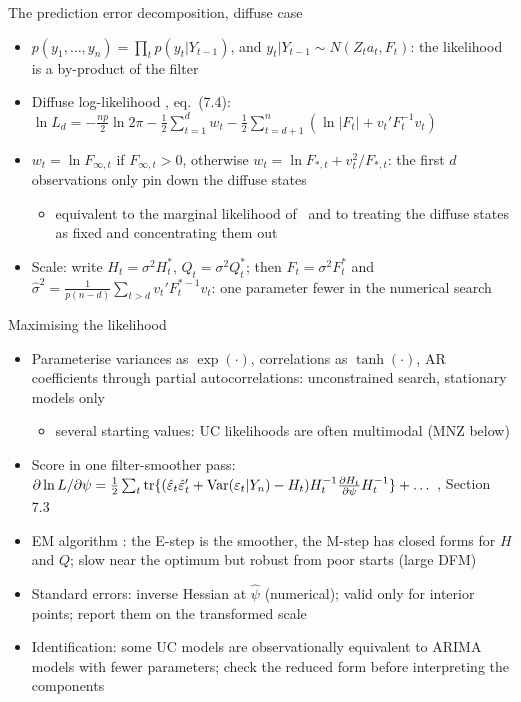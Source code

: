 \begin{frame}{The prediction error decomposition, diffuse case}
\itemsize{\small}
\begin{itemize}
    \item $p(y_1, \dots, y_n) = \prod_t p(y_t | Y_{t-1})$, and $y_t | Y_{t-1} \sim N(Z_ta_t, F_t)$: the likelihood is a by-product of the filter
    \item Diffuse log-likelihood , eq.~(7.4): $\ln L_d = -\frac{np}{2}\ln 2\pi - \frac12\sum_{t=1}^d w_t - \frac12\sum_{t=d+1}^n(\ln|F_t| + v_t'F_t^{-1}v_t)$
    \item $w_t = \ln F_{\infty,t}$ if $F_{\infty,t} > 0$, otherwise $w_t = \ln F_{*,t} + v_t^2/F_{*,t}$: the first $d$ observations only pin down the diffuse states
    \begin{itemize}
        \item equivalent to the marginal likelihood of \ and to treating the diffuse states as fixed and concentrating them out
    \end{itemize}
    \item Scale: write $H_t = \sigma^2H^*_t$, $Q_t = \sigma^2Q^*_t$; then $F_t = \sigma^2F^*_t$ and $\hat\sigma^2 = \frac{1}{p(n - d)}\sum_{t>d}v_t'F_t^{*-1}v_t$: one parameter fewer in the numerical search
\end{itemize}
\end{frame}

\begin{frame}{Maximising the likelihood}
\itemsize{\small}
\begin{itemize}
    \item Parameterise variances as $\exp(\cdot)$, correlations as $\tanh(\cdot)$, AR coefficients through partial autocorrelations: unconstrained search, stationary models only
    \begin{itemize}
        \item several starting values: UC likelihoods are often multimodal (MNZ below)
    \end{itemize}
    \item Score in one filter-smoother pass: $\partial\ln L/\partial\psi = \frac12\sum_t\mathrm{tr}\{(\hat\varepsilon_t\hat\varepsilon_t' + \text{Var}(\varepsilon_t|Y_n) - H_t)H_t^{-1}\tfrac{\partial H_t}{\partial\psi}H_t^{-1}\} + \dots$ , Section 7.3
    \item EM algorithm : the E-step is the smoother, the M-step has closed forms for $H$ and $Q$; slow near the optimum but robust from poor starts (large DFM)
    \item Standard errors: inverse Hessian at $\hat\psi$ (numerical); valid only for interior points; report them on the transformed scale
    \item Identification: some UC models are observationally equivalent to ARIMA models with fewer parameters; check the reduced form before interpreting the components
\end{itemize}
\end{frame}

